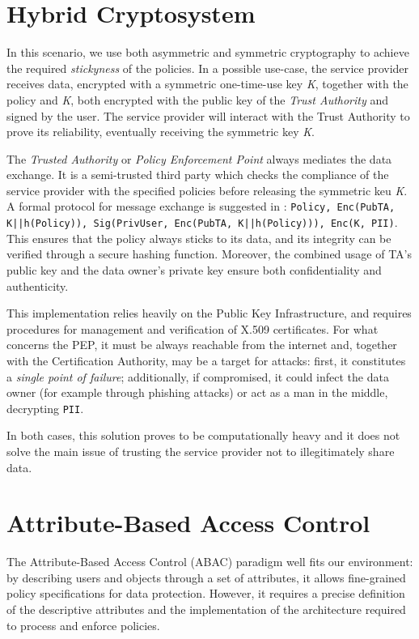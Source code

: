 \section{Hybrid Cryptosystem}
In this scenario, we use both asymmetric and symmetric cryptography to achieve the required \textit{stickyness} of the policies. In a possible use-case, the service provider receives data, encrypted with a symmetric one-time-use key \textit{K}, together with the policy and \textit{K}, both encrypted with the public key of the \textit{Trust Authority} and signed by the user. The service provider will interact with the Trust Authority to prove its reliability, eventually receiving the symmetric key \textit{K}.

The \textit{Trusted Authority} or \textit{Policy Enforcement Point} always mediates the data exchange. It is a semi-trusted third party which checks the compliance of the service provider with the specified policies before releasing the symmetric keu \textit{K}. A formal protocol for message exchange is suggested in \cite{pearson2011sticky}: \texttt{Policy, Enc(PubTA, K||h(Policy)), Sig(PrivUser, Enc(PubTA, K||h(Policy))), Enc(K, PII)}. This ensures that the policy always sticks to its data, and its integrity can be verified through a secure hashing function. Moreover, the combined usage of TA's public key and the data owner's private key ensure both confidentiality and authenticity. 

This implementation relies heavily on the Public Key Infrastructure, and requires procedures for management and verification of X.509 certificates. For what concerns the PEP, it must be always reachable from the internet and, together with the Certification Authority, may be a target for attacks: first, it constitutes a \textit{single point of failure}; additionally, if compromised, it could infect the data owner (for example through phishing attacks) or act as a man in the middle, decrypting \texttt{PII}.

In both cases, this solution proves to be computationally heavy and it does not solve the main issue of trusting the service provider not to illegitimately share data.

\section{Attribute-Based Access Control}
The Attribute-Based Access Control (ABAC) paradigm well fits our environment: by describing users and objects through a set of attributes, it allows fine-grained policy specifications for data protection. However, it requires a precise definition of the descriptive attributes and the implementation of the architecture required to process and enforce policies.

